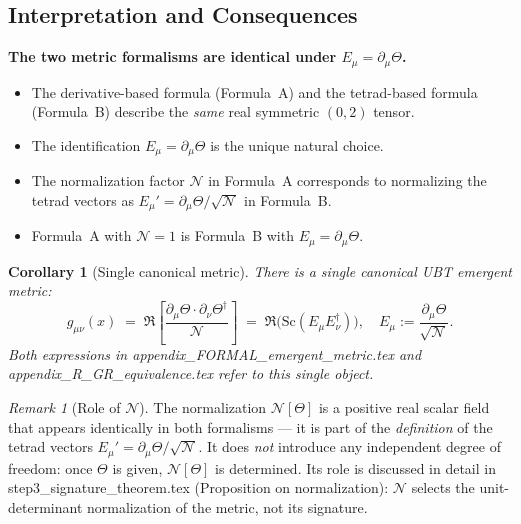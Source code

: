 \documentclass[12pt]{article}
\newtheorem{corollary}[theorem]{Corollary}
\theoremstyle{definition}
\theoremstyle{remark}
\newtheorem{remark}[theorem]{Remark}
\begin{document}
\subsection{Interpretation and Consequences}

\begin{tcolorbox}[colback=green!5!white,colframe=green!75!black,title=Verdict: PROVED]
\textbf{The two metric formalisms are identical under $E_\mu = \partial_\mu\Theta$.}

\begin{itemize}
  \item The derivative-based formula (Formula~A) and the tetrad-based formula (Formula~B)
        describe the \emph{same} real symmetric $(0,2)$ tensor.
  \item The identification $E_\mu = \partial_\mu\Theta$ is the unique natural choice.
  \item The normalization factor $\mathcal{N}$ in Formula~A corresponds to normalizing
        the tetrad vectors as $E_\mu' = \partial_\mu\Theta/\sqrt{\mathcal{N}}$ in Formula~B.
  \item Formula~A with $\mathcal{N}=1$ is Formula~B with $E_\mu = \partial_\mu\Theta$.
\end{itemize}
\end{tcolorbox}

\begin{corollary}[Single canonical metric]
\label{cor:canonical}
There is a single canonical UBT emergent metric:
\begin{equation}
  \boxed{g_{\mu\nu}(x)
  \;=\; \Re\!\left[\frac{\partial_\mu\Theta\cdot\partial_\nu\Theta^\dagger}{\mathcal{N}}\right]
  \;=\; \Re\!\bigl(\mathrm{Sc}(E_\mu E_\nu^\dagger)\bigr),
  \quad E_\mu := \frac{\partial_\mu\Theta}{\sqrt{\mathcal{N}}}.}
  \label{eq:canonical_single}
\end{equation}
Both expressions in appendix\_FORMAL\_emergent\_metric.tex and
appendix\_R\_GR\_equivalence.tex refer to this single object.
\end{corollary}

\begin{remark}[Role of $\mathcal{N}$]
The normalization $\mathcal{N}[\Theta]$ is a positive real scalar field that appears
identically in both formalisms — it is part of the \emph{definition} of the tetrad vectors
$E_\mu' = \partial_\mu\Theta/\sqrt{\mathcal{N}}$.  It does \emph{not} introduce any
independent degree of freedom: once $\Theta$ is given, $\mathcal{N}[\Theta]$ is
determined.  Its role is discussed in detail in step3\_signature\_theorem.tex
(Proposition on normalization): $\mathcal{N}$ selects the unit-determinant normalization
of the metric, not its signature.
\end{remark}
\end{document}
